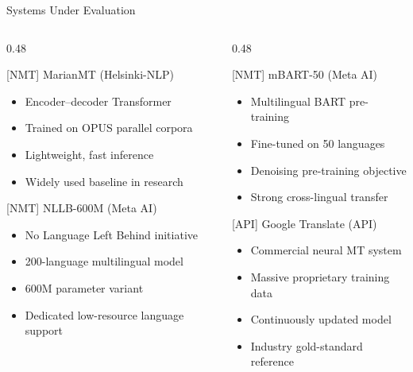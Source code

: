 \documentclass{beamer}
\begin{document}
\begin{frame}{Systems Under Evaluation}
  \begin{columns}[T]
    \begin{column}{0.48\textwidth}
      \begin{block}{[NMT] MarianMT (Helsinki-NLP)}
        \begin{itemize}
          \item Encoder–decoder Transformer
          \item Trained on OPUS parallel corpora
          \item Lightweight, fast inference
          \item Widely used baseline in research
        \end{itemize}
      \end{block}
      \vspace{0.3cm}
      \begin{block}{[NMT] NLLB-600M (Meta AI)}
        \begin{itemize}
          \item No Language Left Behind initiative
          \item 200-language multilingual model
          \item 600M parameter variant
          \item Dedicated low-resource language support
        \end{itemize}
      \end{block}
    \end{column}
    \begin{column}{0.48\textwidth}
      \begin{block}{[NMT] mBART-50 (Meta AI)}
        \begin{itemize}
          \item Multilingual BART pre-training
          \item Fine-tuned on 50 languages
          \item Denoising pre-training objective
          \item Strong cross-lingual transfer
        \end{itemize}
      \end{block}
      \vspace{0.3cm}
      \begin{block}{[API] Google Translate (API)}
        \begin{itemize}
          \item Commercial neural MT system
          \item Massive proprietary training data
          \item Continuously updated model
          \item Industry gold-standard reference
        \end{itemize}
      \end{block}
    \end{column}
  \end{columns}
\end{frame}
\end{document}
